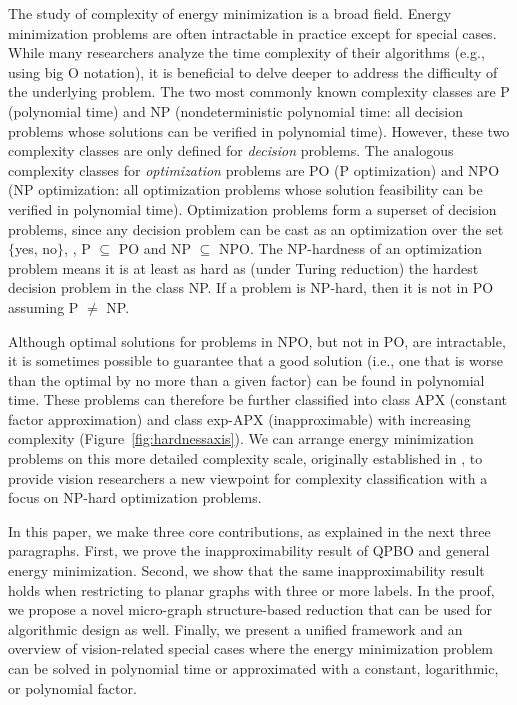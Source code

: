 %

The study of complexity of energy minimization is a broad field. Energy minimization problems are often intractable in practice except for special cases.  While many researchers analyze the time complexity of their algorithms (e.g., using big O notation), it is beneficial to delve deeper to address the difficulty of the underlying problem.  The two most commonly known complexity classes are P (polynomial time) and NP (nondeterministic polynomial time: all decision problems whose solutions can be verified in polynomial time). However, these two complexity classes are only defined for {\em decision} problems. The analogous complexity classes for {\em optimization} problems are PO (P optimization) and NPO (NP optimization: all optimization problems whose solution feasibility can be verified in polynomial time). Optimization problems form a superset of decision problems, since any decision problem can be cast as an optimization over the set $\{$yes, no$\}$, \ie, P $\subseteq$ PO and NP $\subseteq$ NPO. The NP-hardness of an optimization problem means it is at least as hard as (under Turing reduction) the hardest decision problem in the class NP. If a problem is NP-hard, then it is not in PO assuming P $\neq$ NP. 

Although optimal solutions for problems in NPO, but not in PO, are intractable, it is sometimes possible to guarantee that a good solution (i.e., one that is worse than the optimal by no more than a given factor) can be found in polynomial time.  These problems can therefore be further classified into class APX (constant factor approximation) and class exp-APX (inapproximable) with increasing complexity (Figure~\ref{fig:hardnessaxis}).  We can arrange energy minimization problems on this more detailed complexity scale, originally established in \cite{ausiello1999complexity}, to provide vision researchers a new viewpoint for complexity classification with a focus on NP-hard optimization problems.


In this paper, we make three core contributions, as explained in the next three paragraphs. First, we prove the inapproximability result of QPBO and general energy minimization. Second, we show that the same inapproximability result holds when restricting to planar graphs with three or more labels. In the proof, we propose a novel micro-graph structure-based reduction that can be used for algorithmic design as well. Finally, we present a unified framework and an overview of vision-related special cases where the energy minimization problem can be solved in polynomial time or approximated with a constant, logarithmic, or polynomial factor. 


